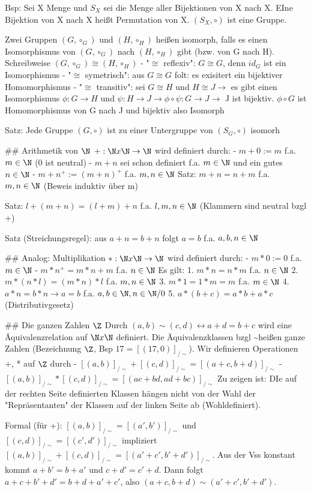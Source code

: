\documentclass[10pt,landscape]{article}
\begin{document}
\begin{multicols}{3}
{{Bsp: Sei X Menge und $S_X$ sei die Menge aller Bijektionen von X nach X. EIne Bijektion von X nach X heißt Permutation von X. $(S_X, \circ)$ ist eine Gruppe.


Zwei Gruppen $(G, \circ_G)$ und $(H,\circ_H)$ heißen isomorph, falls es einen Isomorphismus von $(G,\circ_G)$ nach $(H,\circ_H)$ gibt (bzw. von G nach H). Schreibweise $(G,\circ_G)\cong (H,\circ_H)$
- "$\cong$ reflexiv": $G\cong G$, denn $id_G$ ist ein Isomorphismus
- "$\cong$ symetrisch": aus $G\cong G$ folt: es exisitert ein bijektiver Homomorphismus
- "$\cong$ transitiv": sei $G\cong H$ und $H\cong J \rightarrow$ es gibt einen Isomorphismus $\phi:G\rightarrow H$ und $\psi:H\rightarrow J \rightarrow \phi\circ \psi :G\rightarrow J \rightarrow$ J ist bijektiv. $\phi\circ G$ ist Homomorphismus von G nach J und bijektiv also Isomorph

Satz: Jede Gruppe $(G,\circ)$ ist zu einer Untergruppe von $(S_G, \circ)$ isomorh

## Arithmetik von $\N$
$+: \N x \N \rightarrow \N$ wird definiert durch:
- $m+0:=m$ f.a. $m\in \N$ (0 ist neutral)
- $m+n$ sei schon definiert f.a. $m\in \N$ und ein gutes $n\in \N$
- $m+n^+:=(m+n)^+$ f.a. $m,n \in \N$
Satz: $m+n=n+m$ f.a. $m,n\in\N$ (Beweis induktiv über m)

Satz: $l+(m+n)=(l+m)+n$ f.a. $l,m,n\in\N$ (Klammern sind neutral bzgl +)

Satz (Streichungsregel): aus $a+n=b+n$ folgt $a=b$ f.a. $a,b,n\in\N$

## Analog: Multiplikation
$*: \N x \N \rightarrow \N$ wird definiert durch:
- $m*0:=0$ f.a. $m\in \N$
- $m*n^+=m*n+m$ f.a. $n\in\N$
Es gilt:
1. $m*n=n*m$ f.a. $n\in\N$
2. $m*(n*l)=(m*n)*l$ f.a. $m,n\in\N$
3. $m*1 = 1*m =m$ f.a. $m\in\N$
4. $a*n=b*n \rightarrow a=b$ f.a. $a,b\in\N, n\in\N/{0}$
5. $a*(b+c)=a*b+a*c$ (Distributivgesetz)

## Die ganzen Zahlen $\Z$
Durch $(a,b)\sim (c,d)\leftrightarrow a+d=b+c$ wird eine Äquivalenzrelation auf $\N x\N$ definiert.
Die Äquivalenzklassen bzgl \sim  heißen ganze Zahlen (Bezeichnung $\Z$, Bsp $17=[(17,0)]_{/\sim }$).
Wir definieren Operationen +, * auf $\Z$ durch
- $[(a,b)]_{/\sim } + [(c,d)]_{/\sim } = [(a+c, b+d)]_{/\sim }$
- $[(a,b)]_{/\sim } * [(c,d)]_{/\sim } = [(ac+bd, ad+bc)]_{/\sim }$
Zu zeigen ist: DIe auf der rechten Seite definierten Klassen hängen nicht von der Wahl der "Repräsentanten" der Klassen auf der linken Seite ab (Wohldefiniert).

Formal (für +): $[(a,b)]_{/\sim } = [(a',b')]_{/\sim }$ und $[(c,d)]_{/\sim } = [(c',d')]_{/\sim }$ impliziert $[(a,b)]_{/\sim } + [(c,d)]_{/\sim } = [(a'+c', b'+d')]_{/\sim }$. Aus der Vss konstant kommt $a+b'=b+a'$ und $c+d'=c'+d$. Dann folgt $a+c+b'+d'=b+d+a'+c'$, also $(a+c, b+d)\sim (a'+c',b'+d')$.

}}
\end{multicols}
\end{document}
